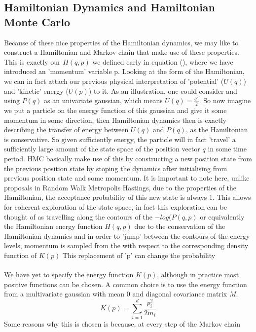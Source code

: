\documentclass[11pt]{article}
\begin{document}
\subsection{Hamiltonian Dynamics and Hamiltonian Monte Carlo}
Because of these nice properties of the Hamiltonian dynamics, we may like to construct a Hamiltonian and Markov chain that make use of these properties. This is exactly our $H(q,p)$ we defined early in equation (), where we have introduced an 'momentum' variable p. Looking at the form of the Hamiltonian, we can in fact attach our previous physical interpretation of 'potential' ($U(q)$) and 'kinetic' energy ($U(p)$) to it. As an illustration, one could consider and using $P(q)$ as an univariate gaussian, which means $U(q)=\frac{q^2}{2}$. So now imagine we put a particle on the energy function of this gaussian and give it some momentum in some direction, then Hamiltonian dynamics then is exactly describing the transfer of energy between $U(q)$ and $P(q)$, as the Hamiltonian is conservative. So given sufficiently energy, the particle will in fact 'travel' a sufficiently large amount of the state space of the position vector $q$ in some time period. HMC basically make use of this by constructing a new  position state from the previous position state by stoping the dynamics after initialising from previous position state and some momentum. It is important to note here, unlike proposals in Random Walk Metropolis Hastings, due to the properties of the Hamiltonian, the acceptance probability of this new state is always 1. This allows for coherent exploration of the state space, in fact this exploration can be thought of as  travelling along the contours of the $-log( P(q,p)$ or equivalently the Hamiltonian energy function $H(q,p)$ due to the conservation of the Hamiltonian dynamics and in order to 'jump' between the contours of the energy levels, momentum is sampled from the with respect to the corresponding density function of $K(p)$ This replacement of 'p' can change the probability 
\\
\\
We have yet to specify the energy function $K(p)$, although in practice most positive functions can be chosen. A common choice is to use the energy function from a multivariate gaussian with mean 0 and diagonal covariance matrix $M$.
\begin{equation}
K(p) = \sum_{i=1}^{d} \frac{p_{i}^{2}}{2m_{i}}
\end{equation}
Some reasons why this is chosen is because, at every step of the Markov chain
\end{document}
